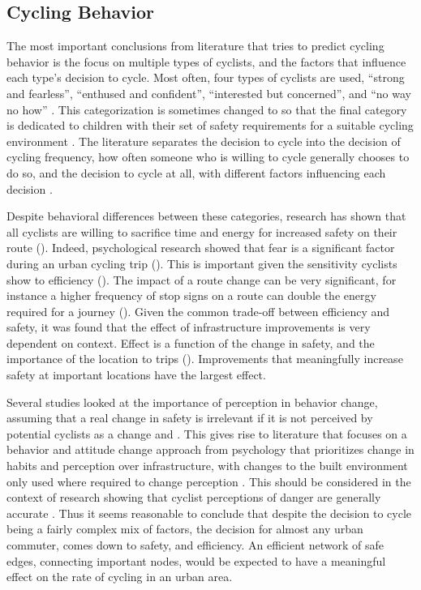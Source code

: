 
\subsection{Cycling Behavior}

The most important conclusions from literature that tries to predict cycling behavior is the focus on multiple types of cyclists, and the factors that influence each type's decision to cycle. Most often, four types of cyclists are used, ``strong and fearless'', ``enthused and confident'', ``interested but concerned'', and ``no way no how'' \parencite{dill2013four}. This categorization is sometimes changed to so that the final category is dedicated to children with their set of safety requirements for a suitable cycling environment \parencite{mekuria2012low}. The literature separates the decision to cycle into the decision of cycling frequency, how often someone who is willing to cycle generally chooses to do so, and the decision to cycle at all, with different factors influencing each decision \parencite{stinson2005comparison}. 

Despite behavioral differences between these categories, research has shown that all cyclists are willing to sacrifice time and energy for increased safety on their route (\cite{winters2011motivators}). Indeed, psychological research showed that fear is a significant factor during an urban cycling trip (\cite{ellett2018state}). This is important given the sensitivity cyclists show to efficiency (\cite{wuerzer2015cycling}). The impact of a route change can be very significant, for instance a higher frequency of stop signs on a route can double the energy required for a journey (\cite{fajans2001bicyclists}). Given the common trade-off between efficiency and safety, it was found that the effect of infrastructure improvements is very dependent on context. Effect is a function of the change in safety, and the importance of the location to trips (\cite{kondo2018bike}). Improvements that meaningfully increase safety at important locations have the largest effect. 

Several studies looked at the importance of perception in behavior change, assuming that a real change in safety is irrelevant if it is not perceived by potential cyclists as a change \parencite{li2012physical} and \parencite{parkin2007models}. This gives rise to literature that focuses on a behavior and attitude change approach from psychology that prioritizes change in habits and perception over infrastructure, with changes to the built environment only used where required to change perception \parencite{savan2017integrated}. This should be considered in the context of research showing that cyclist perceptions of danger are generally accurate \parencite{vandenbulcke2014predicting}. Thus it seems reasonable to conclude that despite the decision to cycle being a fairly complex mix of factors, the decision for almost any urban commuter, comes down to safety, and efficiency. An efficient network of safe edges, connecting important nodes, would be expected to have a meaningful effect on the rate of cycling in an urban area.  

